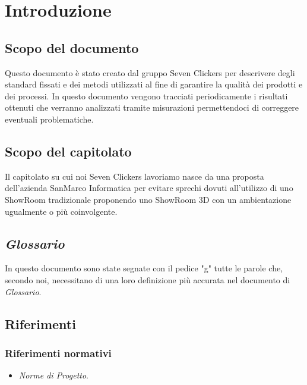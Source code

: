 \section{Introduzione}
\subsection{Scopo del documento}
Questo documento è stato creato dal gruppo Seven Clickers per descrivere degli standard fissati e dei metodi utilizzati al fine di garantire la qualità dei prodotti e dei processi.
In questo documento vengono tracciati periodicamente i risultati ottenuti che verranno analizzati tramite misurazioni permettendoci di correggere eventuali problematiche.

\subsection{Scopo del capitolato}
Il capitolato su cui noi Seven Clickers lavoriamo nasce da una proposta dell'azienda SanMarco Informatica per evitare sprechi dovuti all'utilizzo di uno ShowRoom tradizionale proponendo uno ShowRoom 3D con un ambientazione ugualmente o più coinvolgente.

\subsection{\textit{Glossario}}
In questo documento sono state segnate con il pedice "g" tutte le parole che, secondo noi, necessitano di una loro definizione più accurata nel documento di \textit{Glossario}.

\subsection{Riferimenti}
\subsubsection{Riferimenti normativi}
\begin{itemize}
\item \textit{Norme di Progetto}.
\end{itemize}

